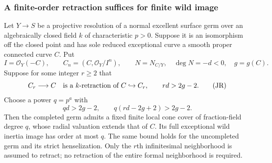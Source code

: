 \subsubsection{A finite-order retraction suffices for finite wild image}

\begin{proposition}
\label{D:finite-jet-cone-cover}
Let $Y\to S$ be a projective resolution of a normal excellent
surface germ over an algebraically closed field $k$ of
characteristic $p>0$.  Suppose it is an isomorphism off the
closed point and has sole reduced exceptional curve a smooth
proper connected curve $C$.  Put
\[
 I=\mathcal O_Y(-C),\qquad
 C_n=(C,\mathcal O_Y/I^n),\qquad
 N=N_{C/Y},\quad \deg N=-d<0,\quad g=g(C).
\]
Suppose for some integer $r\geq2$ that
\[
 C_r\longrightarrow C
 \quad\hbox{is a $k$-retraction of }C\hookrightarrow C_r,
 \qquad rd>2g-2.                                      \tag{JR}
\]
Choose a power $q=p^a$ with
\[
       qd>2g-2,\qquad q(rd-2g+2)>2g-2.                \tag{JQ}
\]
Then the completed germ admits a fixed finite local cone
cover of fraction-field degree $q$, whose radial valuation
extends that of $C$.  Its full exceptional wild inertia image
has order at most $q$.  The same bound holds for the
uncompleted germ and its strict henselization.
Only the $r$th infinitesimal neighborhood is assumed to
retract; no retraction of the entire formal neighborhood
is required.
\end{proposition}

